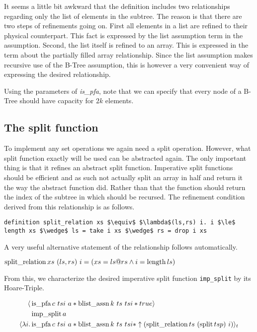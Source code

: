 It seems a little bit awkward that the definition
includes two relationships regarding only the list of elements in the subtree.
The reason is that there are two steps of refinements going on.
First all elements in a list are refined to their physical counterpart.
This fact is expressed by the list assumption term in the assumption.
Second, the list itself is refined to an array.
This is expressed in the term about the partially filled array relationship.
Since the list assumption makes recursive use of the
B-Tree assumption, this is however a very convenient
way of expressing the desired relationship.

Using the parameters of \textit{is\_pfa},
note that we can specify that every node of a B-Tree should have
capacity for $2k$ elements.

\subsection{The split function}
\label{sec:imp-split}

To implement any set operations we again need a split operation.
However, what split function exactly will be used can be abstracted again.
The only important thing is that it refines an abstract split function.
Imperative split functions should be efficient and as such not actually
split an array in half and return it the way the abstract function did.
Rather than that the function should return the index of the subtree
in which should be recursed.
The refinement condition derived from this relationship is as follows.

\begin{lstlisting}[mathescape=true, language=Isabelle]
definition split_relation xs $\equiv$ $\lambda$(ls,rs) i. i $\le$ length xs $\wedge$ ls = take i xs $\wedge$ rs = drop i xs
\end{lstlisting}

A very useful alternative statement of the relationship follows automatically.

\begin{lemma}
    $\operatorname{split\_relation} xs\ (ls,rs)\ i = (xs = ls@rs \wedge i = \operatorname{length} ls)$
\end{lemma}

From this, we characterize the desired imperative
split function \texttt{imp\_split} by its Hoare-Triple.

\begin{align*}
    \langle & \operatorname{is\_pfa} c\ tsi\ a * \operatorname{blist\_assn} k\ ts\ tsi *  true \rangle \\
            & \operatorname{imp\_split} a \\
\langle\lambda i. & \operatorname{is\_pfa} c\ tsi\ a * \operatorname{blist\_assn} k\ ts\ tsi * \uparrow(\operatorname{split\_relation} ts\ (\operatorname{split} ts p)\ i)\rangle_t
\end{align*}

